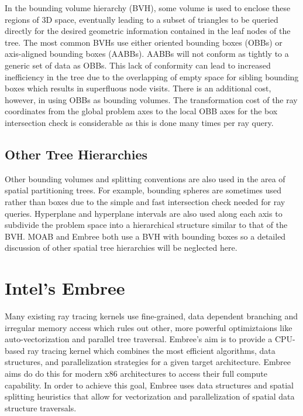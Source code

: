 \documentclass{anstrans}
\begin{document}
In the bounding volume hierarchy (BVH), some volume is used to enclose these regions of 3D space, eventually leading to a subset of triangles to be queried directly for the desired geometric information contained in the leaf nodes of the tree. The most common BVHs use either oriented bounding boxes (OBBs) or axis-aligned bounding boxes (AABBs). AABBs will not conform as tightly to a generic set of data as OBBs. This lack of conformity can lead to increased inefficiency in the tree due to the overlapping of empty space for sibling bounding boxes which results in superfluous node visits. There is an additional cost, however, in using OBBs as bounding volumes. The transformation cost of the ray coordinates from the global problem axes to the local OBB axes for the box intersection check is considerable as this is done many times per ray query. 

\subsection{Other Tree Hierarchies} 

Other bounding volumes and splitting conventions are also used in the area of spatial partitioning trees. For example, bounding spheres are sometimes used rather than boxes due to the simple and fast intersection check needed for ray queries. Hyperplane and hyperplane intervals are also used along each axis to subdivide the problem space into a hierarchical structure similar to that of the BVH. MOAB and Embree both use a BVH with bounding boxes so a detailed discussion of other spatial tree hierarchies will be neglected here.

\section{Intel's Embree}

Many existing ray tracing kernels use fine-grained, data dependent branching and irregular memory access which rules out other, more powerful optimiztaions like auto-vectorization and parallel tree traversal. Embree's aim is to provide a CPU-based ray tracing kernel which combines the most efficient algorithms, data structures, and parallelization strategies for a given target architecture. Embree aims do do this for modern x86 architectures to access their full compute capability. In order to achieve this goal, Embree uses data structures and spatial splitting heuristics that allow for vectorization and parallelization of spatial data structure traversals.
\end{document}
